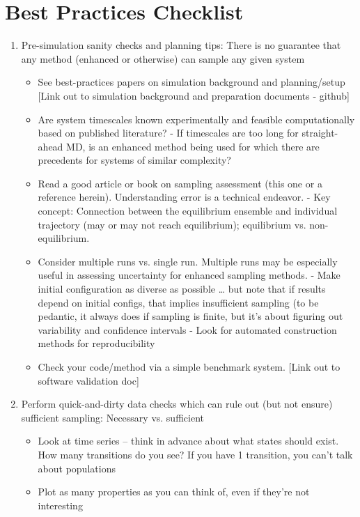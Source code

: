 \documentclass[9pt,bestpractices]{livecoms}
\begin{document}
\section{Best Practices Checklist}
\begin{enumerate}
\item
Pre-simulation sanity checks and planning tips: There is no guarantee that any method (enhanced or otherwise) can sample any given system
    \begin{itemize}
    \item See best-practices papers on simulation background and planning/setup [Link out to simulation background and preparation documents - github]
    \item Are system timescales known experimentally and feasible computationally based on published literature?
      - If timescales are too long for straight-ahead MD, is an enhanced method being used for which there are precedents for systems of similar complexity?
    \item Read a good article or book on sampling assessment (this one or a reference herein).  Understanding error is a technical endeavor.
      - Key concept: Connection between the equilibrium ensemble and individual trajectory (may or may not reach equilibrium); equilibrium vs. non-equilibrium.
    \item Consider multiple runs vs. single run.  Multiple runs may be especially useful in assessing uncertainty for enhanced sampling methods.
      - Make initial configuration as diverse as possible  … but note that if results depend on initial configs, that implies insufficient sampling (to be pedantic, it always does if sampling is finite, but it’s about figuring out variability and confidence intervals
      - Look for automated construction methods for reproducibility
    \item Check your code/method via a simple benchmark system.  [Link out to software validation doc]
    \end{itemize}
\item
Perform quick-and-dirty data checks which can rule out (but not ensure) sufficient sampling: Necessary vs. sufficient
    \begin{itemize}
    \item Look at time series -- think in advance about what states should exist. How many transitions do you see? If you have 1 transition, you can’t talk about populations
    \item Plot as many properties as you can think of, even if they’re not interesting

\end{itemize}
\end{enumerate}
\end{document}
